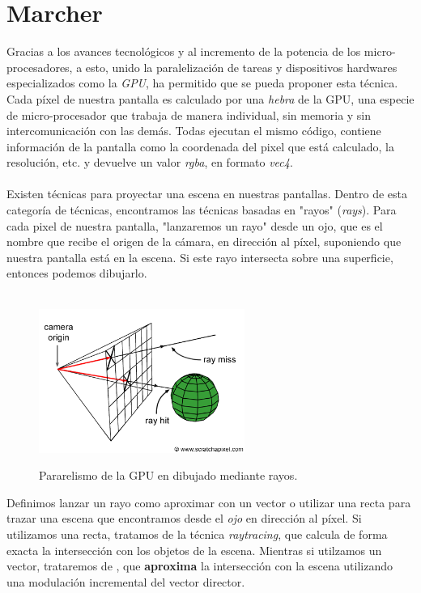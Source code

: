 \chapter{Marcher}
Gracias a los avances tecnológicos y al incremento de la potencia de los micro-procesadores, a esto, unido la paralelización de tareas y dispositivos hardwares especializados como la \textit{GPU}, ha permitido que se pueda proponer esta técnica. Cada píxel de nuestra pantalla es calculado por una \textit{hebra} de la GPU, una especie de micro-procesador que trabaja de manera individual, sin memoria y sin intercomunicación con las demás. Todas ejecutan el mismo código, contiene información de la pantalla como la coordenada del pixel que está calculado, la resolución, etc. y devuelve un valor \textit{rgba}, en formato \textit{vec4}.\\\\
Existen técnicas para proyectar una escena en nuestras pantallas. Dentro de esta categoría de técnicas, encontramos las técnicas basadas en "rayos" (\textit{rays}). Para cada pixel de nuestra pantalla, "lanzaremos un rayo" desde un ojo, que es el nombre que recibe el origen de la cámara, en dirección al píxel, suponiendo que nuestra pantalla está en la escena. Si este rayo intersecta sobre una superficie, entonces podemos dibujarlo.\\\\
\begin{figure}[H]
  \centering
  \captionsetup{justification=centering}
  \includegraphics[width=0.6\textwidth]{secciones/imagenes/gpu.png}\label{fig:marcher}
  \caption{Pararelismo de la GPU en dibujado mediante rayos.}
\end{figure}
Definimos lanzar un rayo como aproximar con un vector o utilizar una recta para trazar una escena que encontramos desde el \textit{ojo} en dirección al píxel. Si utilizamos una recta, tratamos de la técnica \textit{raytracing}, que calcula de forma exacta la intersección con los objetos de la escena. Mientras si utilzamos un vector, trataremos de , que \textbf{aproxima} la intersección con la escena utilizando una modulación incremental del vector director.\\\\
